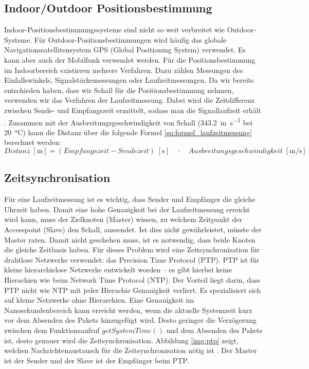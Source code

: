 \subsection{Indoor/Outdoor Positionsbestimmung}
Indoor-Positionsbestimmungssysteme sind nicht so weit verbreitet wie Outdoor-Systeme. Für Outdoor-Positionsbestimmungen wird häufig das globale Navigationssatellitensystem GPS (Global Positioning System) verwendet. Es kann aber auch der Mobilfunk verwendet werden. Für die Positionsbestimmung im Indoorbereich existieren mehrere Verfahren. Dazu zählen Messungen des Einfallswinkels, Signalstärkemessungen oder Laufzeitmessungen. Da wir bereits entschieden haben, dass wir Schall für die Positionsbestimmung nehmen, verwenden wir das Verfahren der Laufzeitmessung. Dabei wird die Zeitdifferenz zwischen Sende- und Empfangszeit ermittelt, sodass man die Signallaufzeit erhält \cite{src_INDOOR_OUTDOOR_SYSTEME}. Zusammen mit der Ausbreitungsgeschwindigkeit von Schall (\SI{343,2}{\metre\per\second} bei \SI{20}{\degreeCelsius}) kann die Distanz über die folgende Formel \ref{eq:formel_laufzeitmessung} berechnet werden:
\begin{equation}
	Distanz \;[\si{\metre}] = (Empfangszeit - Sendezeit)\;[\si{\second}]\quad \cdot \quad Ausbreitungsgeschwindigkeit \;[\si{\metre\per\second}]
   \label{eq:formel_laufzeitmessung}
\end{equation}

\subsection{Zeitsynchronisation}
Für eine Laufzeitmessung ist es wichtig, dass Sender und Empfänger die gleiche Uhrzeit haben. Damit eine hohe Genauigkeit bei der Laufzeitmessung erreicht wird kann, muss der Zielknoten (Master) wissen, zu welchem Zeitpunkt der Accesspoint (Slave) den Schall, aussendet. Ist dies nicht gewährleistet, müsste der Master raten. Damit nicht geschehen muss, ist es notwendig, dass beide Knoten die gleiche Zeitbasis haben. Für dieses Problem wird eine Zeitsynchronisation für drahtlose Netzwerke verwendet: das Precision Time Protocol (PTP). PTP ist für kleine hierarchielose Netzwerke entwickelt worden -- es gibt hierbei keine Hierachien wie beim Network Time Protocol (NTP). Der Vorteil liegt darin, dass PTP nicht wie NTP mit jeder Hierachie Genauigkeit verliert. Es spezialisiert sich auf kleine Netzwerke ohne Hierarchien. Eine Genauigkeit im Nanosekundenbereich kann erreicht werden, wenn die aktuelle Systemzeit kurz vor dem Absenden des Pakets hinzugefügt wird. Desto geringer die Verzögerung zwischen dem Funktionsaufruf $getSystemTime()$ und dem Absenden des Pakets ist, desto genauer wird die Zeitsynchronisation. Abbildung \ref{img:ptp} zeigt, welchen Nachrichtenaustausch für die Zeitsynchronisation nötig ist \cite{src_PTP}. Der Master ist der Sender und der Slave ist der Empfänger beim PTP.


